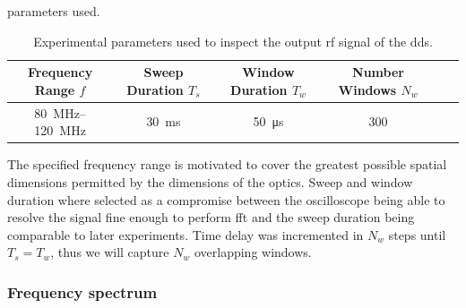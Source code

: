 parameters used.
\begin{table}[htb]
  \centering
  \begin{tabular}{cccccc}
    \toprule
    Frequency Range $f$ &
    Sweep Duration $T_s$ &
    Window Duration $T_w$ &
    Number Windows $N_w$ \\
    \midrule
    \SIrange{80}{120}{\mega\hertz} &
    \SI{30}{\milli\second} &
    \SI{50}{\micro\second} &
    300 \\
    \bottomrule
  \end{tabular}
  \caption{Experimental parameters used to inspect the output \gls{rf} signal
    of the \gls{dds}.
  }\label{tab:signal_parameters_dds}
\end{table}
The specified frequency range is motivated to cover the greatest possible
spatial dimensions permitted by the dimensions of the optics. Sweep and
window duration where selected as a compromise between the oscilloscope being
able to resolve the signal fine enough to perform \gls{fft} and the sweep
duration being comparable to later experiments. Time delay was incremented
in $N_w$ steps until $T_s=T_w$, thus we will capture $N_w$ overlapping windows.

\subsubsection{Frequency spectrum}

